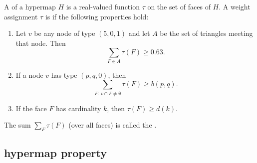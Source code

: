 \begin{definition}
%
  A  of a hypermap $H$ is a real-valued
  function $\tau$ on the set of faces of $H$. A weight assignment
  $\tau$ is  if the following properties hold:
%
%
%
%
%
%
\begin{enumerate}
\item {} 
Let $v$ be any node of type $(5,0,1)$ and let
  $A$ be the set of triangles meeting that node.  Then
\[ \sum_{F\in A} \tau(F)
\ge  0.63.\] 
\item {}
 If a node $v$ has type $(p,q,0)$, then
  \[ \sum_{F:\,v\cap F\ne\emptyset} \tau(F) \ge
    b(p,q).\] 
\item {}
 If the face $F$ has cardinality $k$, then
$\tau(F) \ge d(k)$.
\end{enumerate}
%
%

The sum $\sum_F \tau(F)$ (over all faces) is called the . 
%
\end{definition}





\subsection{hypermap property}
\label{sec:graphproperty}


